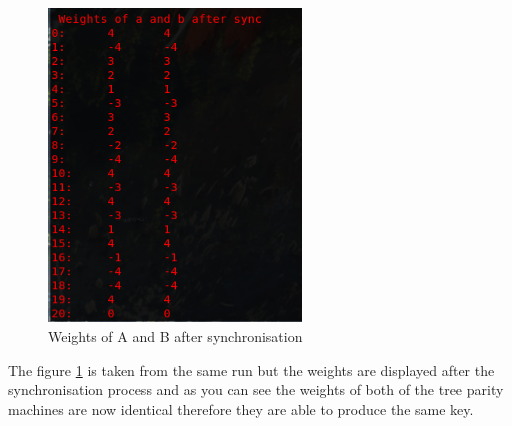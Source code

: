 \begin{figure}[!h]
  \centering
      \includegraphics[width=0.6\textwidth]{Figures/proto8.png}
  \caption[Weights of A and B after synchronisation]{Weights of A and B after synchronisation}
  \label{fig:prototype8}
\end{figure}
\FloatBarrier

The figure \ref{fig:prototype8} is taken from the same run but the weights are displayed after the synchronisation process and as you can see the weights of both of the tree parity machines are now identical therefore they are able to produce the same key.


